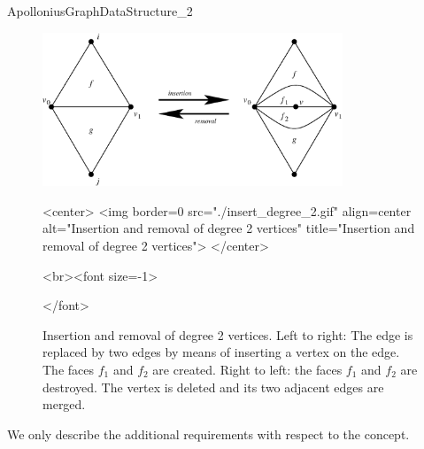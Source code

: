 \begin{ccRefConcept}{ApolloniusGraphDataStructure_2}
\begin{figure}[htb]%
\begin{ccTexOnly}
\begin{center}
\includegraphics[width=0.8\textwidth]
{Apollonius_graph_2_ref/insert_degree_2.eps}
\end{center}
\end{ccTexOnly}
\begin{ccHtmlOnly}
<center>
<img border=0 src="./insert_degree_2.gif" align=center
alt="Insertion and removal of degree 2 vertices"
title="Insertion and removal of degree 2 vertices">
</center>
\end{ccHtmlOnly}
\begin{ccHtmlOnly}
<br><font size=-1>
\end{ccHtmlOnly}
\caption{Insertion and removal of degree 2 vertices. Left to right:
The edge  is replaced by two edges by means of inserting a
vertex  on the edge. The faces $f_1$ and $f_2$ are
created. Right to left: the faces $f_1$ and $f_2$ are
destroyed. The vertex  is deleted and its two adjacent edges
are merged.}
\begin{ccHtmlOnly}
</font>
\end{ccHtmlOnly}
\end{figure}



We only describe the additional requirements with respect to the
 concept.

\ccRefines
{}

%

\begin{ccTexOnly}
\newpage
\end{ccTexOnly}


\end{ccRefConcept}
